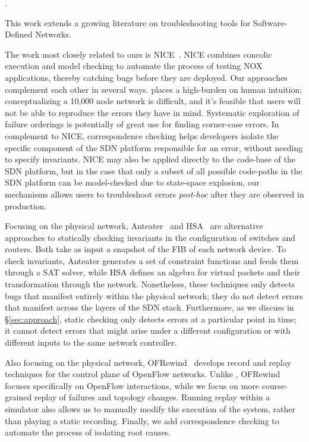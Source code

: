 . 

This work extends a growing literature on troubleshooting tools for
Software-Defined Networks.
    
The work most closely related to ours is NICE~\cite{nice}. NICE combines concolic execution
and model checking to automate the process of testing NOX applications,
thereby catching bugs before
they are deployed. Our approaches complement each other in several ways. 
\Simulator{} places a high-burden on human intuition; conceptualizing
a 10,000 node network is difficult, and it's feasible that users will not be able 
to reproduce the errors they have in mind. Systematic exploration of failure orderings 
is potentially of great use for finding corner-case errors.
In complement to NICE, correspondence checking helps developers isolate the
specific component of the SDN platform responsible for an error, without needing to specify invariants.
NICE may also be applied directly to the code-base of the SDN platform, but in the case that only a subset
of all possible code-paths in the SDN platform can be model-checked due to state-space explosion, 
our mechanisms allows users to troubleshoot errors 
{\it post-hoc} after they are observed in production.

Focusing on the physical network, Anteater~\cite{anteater} and HSA~\cite{hsa}
are alternative approaches to statically checking invariants in the
configuration of switches and routers. Both take as input a snapshot of
the FIB of each network device. To check invariants, Anteater generates a set of constraint functions and feeds them through a SAT
solver, while HSA defines an algebra for virtual packets and
their transformation through the network. Nonetheless, these techniques
only detects bugs that manifest entirely within the physical network;  
they do not detect errors that manifest across the layers of the SDN stack.
Furthermore, as we discuss in \S\ref{sec:approach},
static checking only detects errors at a particular point in time; it cannot 
detect errors that might arise under a different configuration or with different
inputs to the same network controller.

Also focusing on the physical network, OFRewind~\cite{ofrewind} develops
record and replay techniques for the control plane of OpenFlow networks.
Unlike \simulator, OFRewind focuses specifically on OpenFlow
interactions, while we focus on more course-grained replay of
failures and topology changes. Running replay within a simulator also allows
us to manually modify the execution of the system, rather than playing a
static recording. Finally, we add correspondence checking to automate the
process of isolating root causes.

